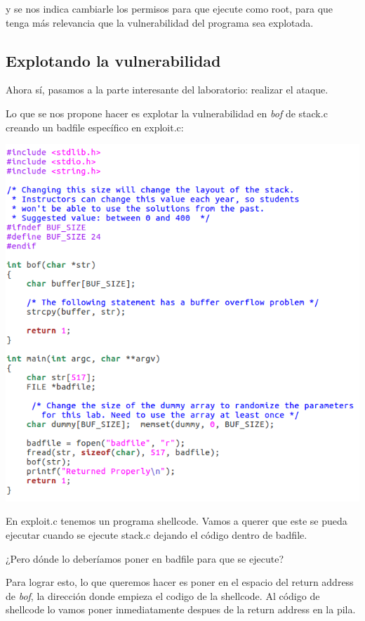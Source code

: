 \documentclass[11pt]{article}
\begin{document}
y se nos indica 
cambiarle los permisos para que ejecute como root, para que tenga más relevancia 
que la vulnerabilidad del programa sea explotada.

\subsection*{Explotando la vulnerabilidad}

Ahora sí, pasamos a la parte interesante del laboratorio: realizar el ataque. 

Lo que se nos propone hacer es explotar la vulnerabilidad en \textit{bof} de stack.c 
creando un badfile específico en exploit.c:

\begin{center}
\includegraphics[scale=0.55]{codigoexploit.png}
\end{center}


En exploit.c tenemos un programa shellcode. Vamos a querer que este se pueda ejecutar
cuando se ejecute stack.c dejando el código dentro de badfile.

¿Pero dónde lo deberíamos poner en badfile para que se ejecute?

Para lograr esto, lo que queremos hacer es poner en el espacio del return address de \textit{bof},
la dirección donde empieza el codigo de la shellcode. Al código de shellcode lo vamos
poner inmediatamente despues de la return address en la pila.
\end{document}
